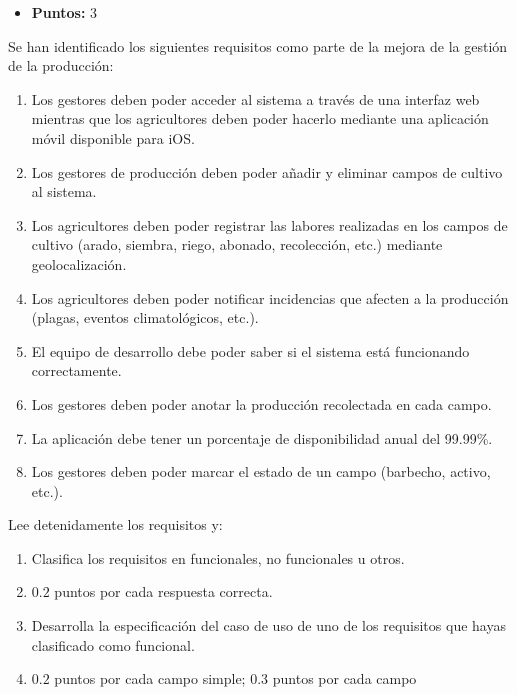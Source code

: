 
\begin{itemize}
    \item \textbf{Puntos:} 3
\end{itemize}

\begin{enunciado}
    Se han identificado los siguientes requisitos como parte de la mejora de la gestión de la
    producción:
    \begin{enumerate}
        \item Los gestores deben poder acceder al sistema a través de una interfaz web mientras que
        los agricultores deben poder hacerlo mediante una aplicación móvil disponible para iOS\@.
        \item Los gestores de producción deben poder añadir y eliminar campos de cultivo al sistema.
        \item Los agricultores deben poder registrar las labores realizadas en los campos de cultivo
        (arado, siembra, riego, abonado, recolección, etc.) mediante geolocalización.
        \item Los agricultores deben poder notificar incidencias que afecten a la producción (plagas,
        eventos climatológicos, etc.).
        \item El equipo de desarrollo debe poder saber si el sistema está funcionando correctamente.
        \item Los gestores deben poder anotar la producción recolectada en cada campo.
        \item La aplicación debe tener un porcentaje de disponibilidad anual del 99.99\%.
        \item Los gestores deben poder marcar el estado de un campo (barbecho, activo, etc.).
    \end{enumerate}
    Lee detenidamente los requisitos y:
    \begin{enumerate}
        \item Clasifica los requisitos en funcionales, no funcionales u otros.
        \item $0.2$ puntos por cada respuesta correcta.
        \item Desarrolla la especificación del caso de uso de uno de los requisitos que hayas
        clasificado como funcional.
        \item $0.2$ puntos por cada campo simple; $0.3$ puntos por cada campo
    \end{enumerate}
\end{enunciado}
